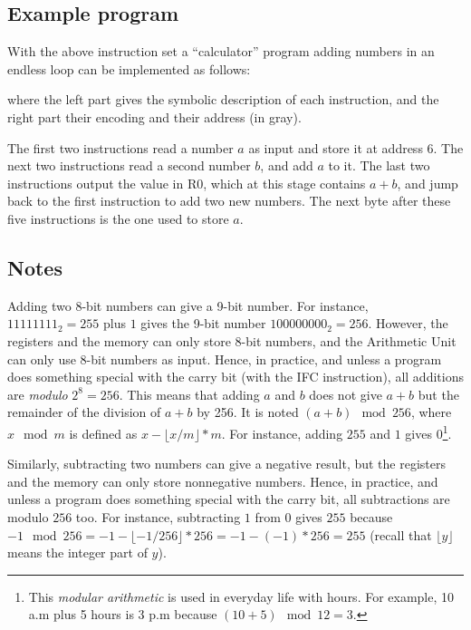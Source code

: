 \subsection{Example program}\label{subsection:adder-program}

With the above instruction set a ``calculator'' program adding numbers in an
endless loop can be implemented as follows:



\noindent where the left part gives the symbolic description of each
instruction, and the right part their encoding and their address (in gray).

The first two instructions read a number $a$ as input and store it at address
$6$. The next two instructions read a second number $b$, and add $a$ to it. The
last two instructions output the value in R0, which at this stage contains
$a+b$, and jump back to the first instruction to add two new numbers. The next
byte after these five instructions is the one used to store $a$.

\subsection{Notes}\label{subsection:int-overflow}

Adding two 8-bit numbers can give a 9-bit number. For instance,
$11111111_2=255$ plus $1$ gives the 9-bit number $100000000_2=256$. However,
the registers and the memory can only store 8-bit numbers, and the Arithmetic
Unit can only use 8-bit numbers as input. Hence, in practice, and unless a
program does something special with the carry bit (with the IFC instruction),
all additions are {\em modulo} $2^8=256$. This means that adding $a$ and $b$
does not give $a+b$ but the remainder of the division of $a+b$ by 256. It is
noted $(a+b) \mod 256$, where $x \mod m$ is defined as $x - \lfloor x / m
\rfloor * m$. For instance, adding $255$ and $1$ gives $0$\footnote{This {\em
modular arithmetic} is used in everyday life with hours. For example, 10 a.m
plus 5 hours is 3 p.m because $(10+5) \mod 12 = 3$.}.

Similarly, subtracting two numbers can give a negative result, but the
registers and the memory can only store nonnegative numbers. Hence, in
practice, and unless a program does something special with the carry bit, all
subtractions are modulo $256$ too. For instance, subtracting $1$ from $0$ gives
$255$ because $-1 \mod 256 = -1 - \lfloor -1 / 256 \rfloor * 256 = -1 -
(-1)*256 = 255$ (recall that $\lfloor y \rfloor$ means the integer part of $y$).

